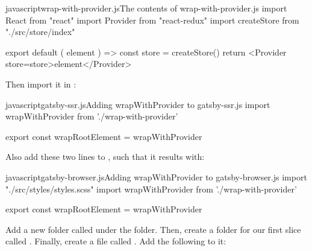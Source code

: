 \documentclass[paper=6in:9in,pagesize=pdftex,headinclude=on,footinclude=on,12pt]{scrbook}
\begin{document}
\begin{codeInput}{javascript}{wrap-with-provider.js}{The contents of wrap-with-provider.js}
import React from "react"
import { Provider } from "react-redux"
import createStore from "./src/store/index"

export default ({ element }) => {
  const store = createStore()
  return <Provider store={store}>{element}</Provider>
}  
\end{codeInput}

Then import it in :

\begin{codeInput}{javascript}{gatsby-ssr.js}{Adding wrapWithProvider to gatsby-ssr.js}
import wrapWithProvider from './wrap-with-provider'

export const wrapRootElement = wrapWithProvider
\end{codeInput}

Also add these two lines to , such that it results with:

\begin{codeInput}{javascript}{gatsby-browser.js}{Adding wrapWithProvider to gatsby-browser.js}
import "./src/styles/styles.scss"
import wrapWithProvider from './wrap-with-provider'

export const wrapRootElement = wrapWithProvider
\end{codeInput}


Add a new folder called  under the  folder. Then, create a folder for our first slice called . Finally, create a file called . Add the following to it:
\end{document}
